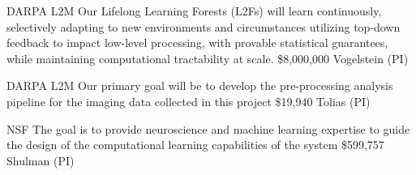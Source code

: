 \documentclass[10pt,colorlinks=true,urlcolor=blue]{moderncv}
\begin{document}
%
    {DARPA L2M}%
    {Our Lifelong Learning Forests (L2Fs) will learn continuously, selectively adapting to new environments and circumstances utilizing top-down feedback to impact low-level processing, with provable statistical guarantees, while maintaining computational tractability at scale.  }%
    {\$8,000,000}%
    {Vogelstein (PI)}{}


%
    {DARPA L2M}%
    {Our primary goal will be to develop the pre-processing analysis pipeline for the imaging data collected in this project}%
    {\$19,940}%
    {Tolias (PI)}{}


%
    {NSF}%
    {The goal is to provide neuroscience and machine learning expertise to guide the design of the computational learning capabilities of the system}%
    {\$599,757}%
    {Shulman (PI)}{}
\end{document}
